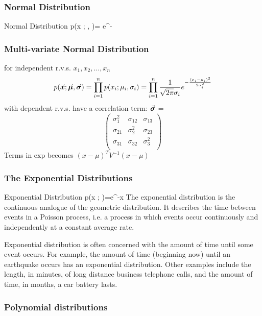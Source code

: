 \documentclass[12pt,a4paper]{article}
\begin{document}
\subsubsection{Normal Distribution}
\begin{definition}
    {Normal Distribution}{
    p(x ; \mu, \sigma)= e^{-}
    }{}
\end{definition}


\subsubsection{Multi-variate Normal Distribution}
for independent r.v.s. $x_1, x_2, \ldots, x_n$ 
$$
p(\va*{x};\va*{\mu},\va*{\sigma}) = \prod_{i=1}^n p(x_i;\mu_i,\sigma_i) = \prod_{i=1}^n \frac{1}{\sqrt{2 \pi} \sigma_i} e^{-\frac{(x_i-\mu_i)^2}{2 \sigma_i^2}}
$$
with dependent r.v.s. have a correlation term:
$\va*{\sigma}$ = 
$$
\begin{pmatrix}
    \sigma_1^2 & \sigma_{12} & \sigma_{13} \\
    \sigma_{21} & \sigma_2^2 & \sigma_{23} \\
    \sigma_{31} & \sigma_{32} & \sigma_3^2 \\
\end{pmatrix}
$$
Terms in exp becomes
$(x-\mu)^T V^{-1} (x-\mu)$
\subsubsection{The Exponential Distributions}
\begin{definition}
    {Exponential Distribution}
    {p(x ; \lambda)=\lambda e^{-\lambda x}}
    {The exponential distribution is the continuous analogue of the geometric distribution. It describes the time between events in a Poisson process, i.e. a process in which events occur continuously and independently at a constant average rate.}
\end{definition}

Exponential distribution is often concerned with the amount of time until some event occurs. For example, the amount of time (beginning now) until an earthquake occurs has an exponential distribution. Other examples include the length, in minutes, of long distance business telephone calls, and the amount of time, in months, a car battery lasts.

\subsubsection{Polynomial distributions} 
\end{document}
